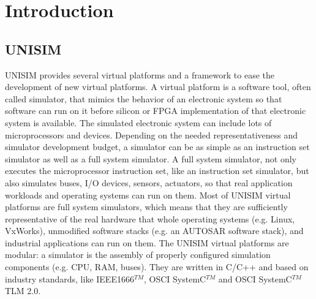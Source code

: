 \section{Introduction}

\subsection{UNISIM}

UNISIM provides several virtual platforms and a framework to ease the development of new virtual platforms.
A virtual platform is a software tool, often called simulator, that mimics the behavior of an electronic system so that software can run on it before silicon or FPGA implementation of that electronic system is available.
The simulated electronic system can include lots of microprocessors and devices.
Depending on the needed representativeness and simulator development budget, a simulator can be as simple as an instruction set simulator as well as a full system simulator.
A full system simulator, not only executes the microprocessor instruction set, like an instruction set simulator, but also simulates buses, I/O devices, sensors, actuators, so that real application workloads and operating systems can run on them.
Most of UNISIM virtual platforms are full system simulators, which means that they are sufficiently representative of the real hardware that whole operating systems (e.g. Linux, VxWorks), unmodified software stacks (e.g. an AUTOSAR software stack), and industrial applications can run on them.
The UNISIM virtual platforms are modular: a simulator is the assembly of properly configured simulation components (e.g. CPU, RAM, buses).
They are written in C/C++ and based on industry standards, like IEEE1666$^{TM}$, OSCI SystemC$^{TM}$ and OSCI SystemC$^{TM}$ TLM 2.0.

